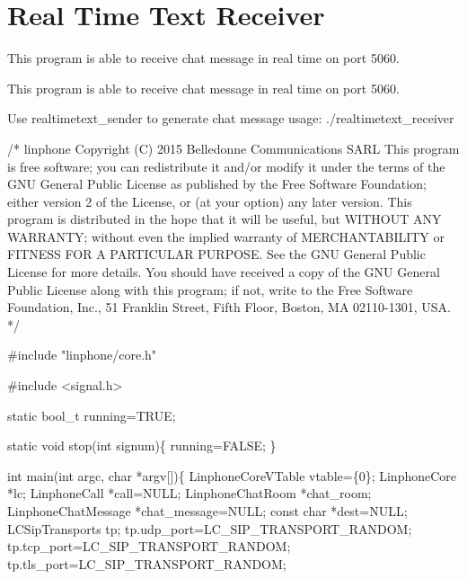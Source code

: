 \section{Real Time Text Receiver}
\label{group__real__time__text}


This program is able to receive chat message in real time on port 5060.  


This program is able to receive chat message in real time on port 5060. 

Use realtimetext\+\_\+sender to generate chat message usage\+: ./realtimetext\+\_\+receiver


\begin{DoxyCodeInclude}

\textcolor{comment}{/*}
\textcolor{comment}{linphone}
\textcolor{comment}{Copyright (C) 2015  Belledonne Communications SARL}
\textcolor{comment}{}
\textcolor{comment}{This program is free software; you can redistribute it and/or}
\textcolor{comment}{modify it under the terms of the GNU General Public License}
\textcolor{comment}{as published by the Free Software Foundation; either version 2}
\textcolor{comment}{of the License, or (at your option) any later version.}
\textcolor{comment}{}
\textcolor{comment}{This program is distributed in the hope that it will be useful,}
\textcolor{comment}{but WITHOUT ANY WARRANTY; without even the implied warranty of}
\textcolor{comment}{MERCHANTABILITY or FITNESS FOR A PARTICULAR PURPOSE.  See the}
\textcolor{comment}{GNU General Public License for more details.}
\textcolor{comment}{}
\textcolor{comment}{You should have received a copy of the GNU General Public License}
\textcolor{comment}{along with this program; if not, write to the Free Software}
\textcolor{comment}{Foundation, Inc., 51 Franklin Street, Fifth Floor, Boston, MA  02110-1301, USA.}
\textcolor{comment}{*/}

\textcolor{preprocessor}{#include "linphone/core.h"}

\textcolor{preprocessor}{#include <signal.h>}

\textcolor{keyword}{static} bool\_t running=TRUE;

\textcolor{keyword}{static} \textcolor{keywordtype}{void} stop(\textcolor{keywordtype}{int} signum)\{
        running=FALSE;
\}



\textcolor{keywordtype}{int} main(\textcolor{keywordtype}{int} argc, \textcolor{keywordtype}{char} *argv[])\{
        LinphoneCoreVTable vtable=\{0\};
        LinphoneCore *lc;
        LinphoneCall *call=NULL;
        LinphoneChatRoom *chat\_room;
        LinphoneChatMessage *chat\_message=NULL;
        \textcolor{keyword}{const} \textcolor{keywordtype}{char} *dest=NULL;
        LCSipTransports tp;
        tp.udp\_port=LC_SIP_TRANSPORT_RANDOM;
        tp.tcp\_port=LC_SIP_TRANSPORT_RANDOM;
        tp.tls\_port=LC_SIP_TRANSPORT_RANDOM;


\end{DoxyCodeInclude}
